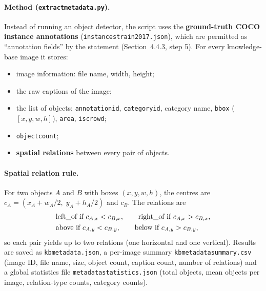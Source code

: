 \documentclass[11pt,a4paper]{article}
\renewcommand{\_}{\textunderscore\allowbreak{}}
\newcommand{\code}[1]{\texttt{#1}}
\begin{document}
\paragraph{Method (\code{extract\_metadata.py}).} Instead of running an object detector, the script uses the \textbf{ground-truth COCO instance annotations} (\code{instances\_train2017.json}), which are permitted as ``annotation fields'' by the statement (Section~4.4.3, step 5). For every knowledge-base image it stores:
\begin{itemize}[nosep]
  \item image information: file name, width, height;
  \item the raw captions of the image;
  \item the list of objects: \code{annotation\_id}, \code{category\_id}, category name, \code{bbox} ($[x,y,w,h]$), \code{area}, \code{iscrowd};
  \item \code{object\_count};
  \item \textbf{spatial relations} between every pair of objects.
\end{itemize}

\paragraph{Spatial relation rule.} For two objects $A$ and $B$ with boxes $(x,y,w,h)$, the centres are $c_A=(x_A+w_A/2,\;y_A+h_A/2)$ and $c_B$. The relations are
\begin{align*}
&\text{left\_of if } c_{A,x}<c_{B,x}, \qquad \text{right\_of if } c_{A,x}>c_{B,x},\\
&\text{above if } c_{A,y}<c_{B,y}, \qquad \text{below if } c_{A,y}>c_{B,y},
\end{align*}
so each pair yields up to two relations (one horizontal and one vertical). Results are saved as \code{kb\_metadata.json}, a per-image summary \code{kb\_metadata\_summary.csv} (image ID, file name, size, object count, caption count, number of relations) and a global statistics file \code{metadata\_statistics.json} (total objects, mean objects per image, relation-type counts, category counts).
\end{document}
